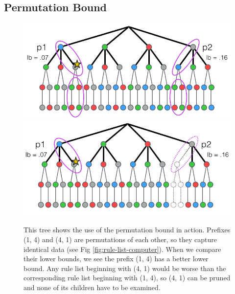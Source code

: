 \subsection{Permutation Bound}
\label{def:perm-bound}

\begin{figure}[t!]
\includegraphics[width=\textwidth]{figs/branch-and-bound-permutations.png}
\includegraphics[width=\textwidth]{figs/branch-and-bound-permutations-pruned.png}
\caption[Permutation bound]{This tree shows the use of the permutation bound in action. 
Prefixes (1, 4) and (4, 1) are permutations of each other, so they capture identical data (see Fig \ref{fig:rule-list-computer}).
When we compare their lower bounds, we see the prefix (1, 4) has a better lower bound.
Any rule list beginning with (4, 1) would be worse than the corresponding rule list beginning with (1, 4), so (4, 1) can be pruned and none of its children have to be examined.
\label{fig:permutation-bound}}
\end{figure}

